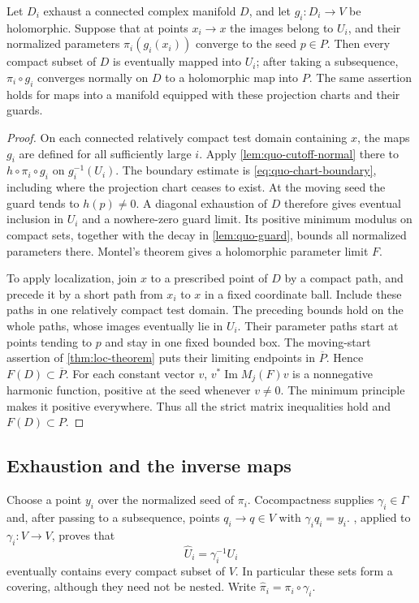 \begin{corollary}\label{cor:quo-trapping}
Let $D_i$ exhaust a connected complex manifold $D$, and let $g_i:D_i\to V$ be holomorphic. Suppose that at points $x_i\to x$ the images belong to $U_i$, and their normalized parameters $\pi_i(g_i(x_i))$ converge to the seed $p\in P$. Then every compact subset of $D$ is eventually mapped into $U_i$; after taking a subsequence, $\pi_i\circ g_i$ converges normally on $D$ to a holomorphic map into $P$. The same assertion holds for maps into a manifold equipped with these projection charts and their guards.
\end{corollary}
\begin{proof}
On each connected relatively compact test domain containing $x$, the maps $g_i$ are defined for all sufficiently large $i$. Apply \cref{lem:quo-cutoff-normal} there to $h\circ\pi_i\circ g_i$ on $g_i^{-1}(U_i)$. The boundary estimate is \eqref{eq:quo-chart-boundary}, including where the projection chart ceases to exist. At the moving seed the guard tends to $h(p)\ne0$. A diagonal exhaustion of $D$ therefore gives eventual inclusion in $U_i$ and a nowhere-zero guard limit. Its positive minimum modulus on compact sets, together with the decay in \cref{lem:quo-guard}, bounds all normalized parameters there. Montel's theorem gives a holomorphic parameter limit $F$.

To apply localization, join $x$ to a prescribed point of $D$ by a compact path, and precede it by a short path from $x_i$ to $x$ in a fixed coordinate ball. Include these paths in one relatively compact test domain. The preceding bounds hold on the whole paths, whose images eventually lie in $U_i$. Their parameter paths start at points tending to $p$ and stay in one fixed bounded box. The moving-start assertion of \cref{thm:loc-theorem} puts their limiting endpoints in $\overline P$. Hence $F(D)\subset\overline P$. For each constant vector $v$, $v^*\operatorname{Im}M_j(F)v$ is a nonnegative harmonic function, positive at the seed whenever $v\ne0$. The minimum principle makes it positive everywhere. Thus all the strict matrix inequalities hold and $F(D)\subset P$.
\end{proof}

\subsection{Exhaustion and the inverse maps}

Choose a point $y_i$ over the normalized seed of $\pi_i$. Cocompactness supplies $\gamma_i\in\Gamma$ and, after passing to a subsequence, points $q_i\to q\in V$ with $\gamma_iq_i=y_i$. , applied to $\gamma_i:V\to V$, proves that
\[
 \widehat U_i=\gamma_i^{-1}U_i
\]
eventually contains every compact subset of $V$. In particular these sets form a covering, although they need not be nested. Write $\widehat\pi_i=\pi_i\circ\gamma_i$.

